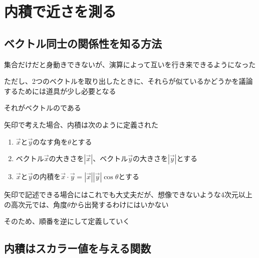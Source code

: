 \documentclass[../book_half_step_linear]{subfiles}
\begin{document}
\section{内積で近さを測る}

\subsection{ベクトル同士の関係性を知る方法}

集合だけだと身動きできないが、演算によって互いを行き来できるようになった

ただし、2つのベクトルを取り出したときに、それらが似ているかどうかを議論するためには道具が少し必要となる

それがベクトルのである

\br

矢印で考えた場合、内積は次のように定義された
\begin{enumerate}
  \item $\overrightarrow{x}$と$\overrightarrow{y}$のなす角を$\theta$とする
  \item ベクトル$\overrightarrow{x}$の大きさを$|\overrightarrow{x}|$、ベクトル$\overrightarrow{y}$の大きさを$|\overrightarrow{y}|$とする
  \item $\overrightarrow{x}$と$\overrightarrow{y}$の内積を$\overrightarrow{x} \cdot \overrightarrow{y} = |\overrightarrow{x}||\overrightarrow{y}|\cos \theta$とする
\end{enumerate}
矢印で記述できる場合にはこれでも大丈夫だが、想像できないような4次元以上の高次元では、角度$\theta$から出発するわけにはいかない

そのため、順番を逆にして定義していく

\sectionline
\subsection{内積はスカラー値を与える関数}
\end{document}
